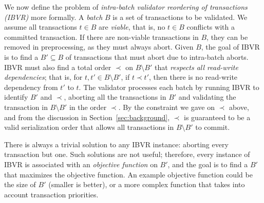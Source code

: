 We now define the problem of {\em intra-batch validator reordering of transactions (IBVR)} more formally. A \emph{batch} $B$ is a set of transactions to be validated. We assume all transactions $t \in B$ are \emph{viable}, that is, no $t \in B$ conflicts with a committed transaction. If there are non-viable transactions in $B$, they can be removed in preprocessing, as they must always abort.
Given $B$, the goal of IBVR is to find a $B' \subseteq B$ of transactions that must abort due to intra-batch aborts. IBVR must also find a 
total order $\prec$ on $B \setminus B'$ that \emph{respects all read-write dependencies}; that is, for $t,t'\in B \setminus B'$, if $t \prec t'$, then there is no read-write dependency from $t'$ to $t$.
The validator processes each batch by running IBVR to identify $B'$ and $\prec$, aborting all the transactions in $B'$  and validating the transaction in $B \setminus B'$  in the order $\prec$. By the constraint we gave on $\prec$ above, and from the discussion in Section~\ref{sec:background}, $\prec$ is guaranteed to be a valid serialization order that allows all transactions in $B \setminus B'$  to commit.



There is always a trivial solution to any IBVR instance: aborting every transaction but one. Such solutions are not useful; therefore, every instance of IBVR is associated with an \emph{objective function} on $B'$, and the goal is to find a $B'$ that maximizes the objective function. An example objective function could be the size of $B'$ (smaller is better), or a more complex function that takes into account transaction priorities.






